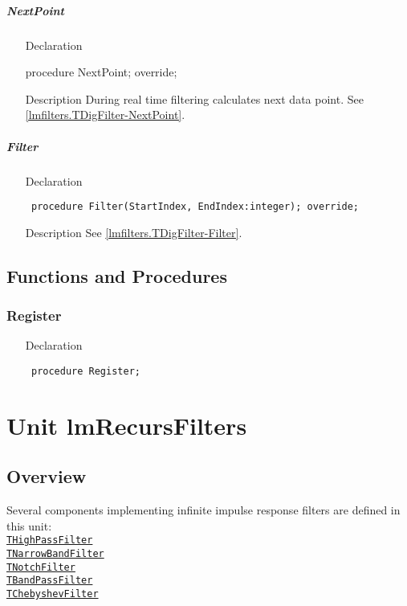 \documentclass[12pt,a4paper,oneside]{report}
\newcommand{\declarationitem}[1]{{\addfontfeatures{FakeSlant} #1}}
\newcommand{\descriptiontitle}[1]{{\addfontfeatures{FakeSlant}#1}}
\newcommand{\code}[1]{\texttt{#1}}
\begin{document}
\paragraph{NextPoint}
\begin{itemize}
	\item[\declarationitem{Declaration}\hfill]
	\begin{flushleft}
		procedure NextPoint; override;	
	\end{flushleft}
	\item[\descriptiontitle{Description}] During real time filtering calculates next data point. See \ref{lmfilters.TDigFilter-NextPoint}.
\end{itemize}	
\paragraph{Filter}
\label{lmfilters.TMedianFilter-filter}
\begin{itemize}\item[\declarationitem{Declaration}\hfill]
	\begin{flushleft}
		\code{
			procedure Filter(StartIndex, EndIndex:integer); override;}
	\end{flushleft}
	\item[\descriptiontitle{Description}\hfill] See \ref{lmfilters.TDigFilter-Filter}.
\end{itemize}
\section{Functions and Procedures}
\subsection{Register}
\label{lmfilters-Register}
\begin{itemize}\item[\declarationitem{Declaration}\hfill]
	\begin{flushleft}
		\code{
			procedure Register;}
	\end{flushleft}
\end{itemize}

\chapter{Unit lmRecursFilters}
\label{lmRecursFilters}
\section{Overview}
Several components implementing infinite impulse response filters are defined in this unit:\\
	\hyperref[lmRecursFilters.THighPassFilter]{\code{THighPassFilter}}\\ 
	\hyperref[lmRecursFilters.TNarrowBandFilter]{\code{TNarrowBandFilter}}\\
	\hyperref[lmRecursFilters.TNotchFilter]{\code{TNotchFilter}}\\
	\hyperref[lmRecursFilters.TBandPassFilter]{\code{TBandPassFilter}}\\
	\hyperref[lmRecursFilters.TChebyshevFilter]{\code{TChebyshevFilter}}
\end{document}
